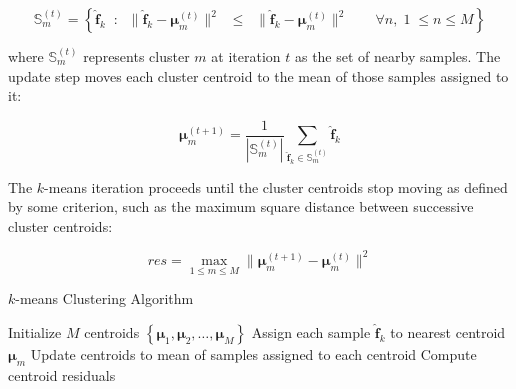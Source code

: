 \begin{equation}
\label{eqn:chap10-kmeans-assign}
\mathbb{S}_{m}^{(t)} = \left\{ \boldsymbol{\hat{f}}_{k} \;\; : \;\; \| \boldsymbol{\hat{f}}_{k} - \boldsymbol{\mu}_{m}^{(t)} \|^{2} \;\; \le \;\; \| \boldsymbol{\hat{f}}_{k} - \boldsymbol{\mu}_{m}^{(t)} \|^{2} \;\;\;\;\;\;\; \forall n, \; 1 \; \le n \le M \right\}
\end{equation}

\noindent where $\mathbb{S}_{m}^{(t)}$ represents cluster $m$ at iteration $t$ as the set of nearby samples. The update step moves each cluster centroid to the mean of those samples assigned to it:

\begin{equation}
\label{eqn:chap10-kmeans-update}
\boldsymbol{\mu}_{m}^{(t+1)} = \frac{1}{|\mathbb{S}_{m}^{(t)}|} \displaystyle\sum\limits_{\boldsymbol{\hat{f}}_{k} \in \mathbb{S}_{m}^{(t)}} \boldsymbol{\hat{f}}_{k}
\end{equation}

The $k$-means iteration proceeds until the cluster centroids stop moving as defined by some criterion, such as the maximum square distance between successive cluster centroids:

\begin{equation}
\label{eqn:chap10-kmeans-residuals}
res = \max_{1 \le m \le M} \|\boldsymbol{\mu}_{m}^{(t+1)} - \boldsymbol{\mu}_{m}^{(t)}\|^{2}
\end{equation}

\begin{algorithm}[ht!]
\caption[$k$-means Clustering Algorithm]{$k$-means Clustering Algorithm}
\label{alg:chap10-kmeans}
\begin{algorithmic}[1]
  \State Initialize $M$ centroids $\left\{ \boldsymbol{\mu}_{1}, \boldsymbol{\mu}_{2}, \dots, \boldsymbol{\mu}_{M} \right\}$
    \State Assign each sample $\boldsymbol{\hat{f}}_{k}$ to nearest centroid $\boldsymbol{\mu}_{m}$ 
    \State Update centroids to mean of samples assigned to each centroid 
    \State Compute centroid residuals 
  \EndWhile
\end{algorithmic}
\end{algorithm}

